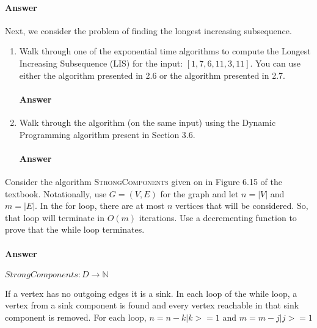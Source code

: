 \documentclass{article}
\begin{document}
\paragraph{Answer}
\todo{}

\collab{\todo{}}

Next, we consider the problem of finding the longest increasing subsequence.

\begin{enumerate}
    \item
        Walk through one of the exponential time algorithms to compute the
        Longest Increasing Subsequence (LIS) for the input: $\left[ 1, 7, 6, 11,
        3, 11 \right]$.  You can use either the algorithm presented in 2.6 or
        the algorithm presented in 2.7.

        \paragraph{Answer} \todo{}

    \item
        Walk through the algorithm (on the same input) using the Dynamic Programming algorithm
        present in Section 3.6.

        \paragraph{Answer} \todo{}

\end{enumerate}

\collab{\todo{}}

Consider the algorithm \textsc{StrongComponents} given on in Figure 6.15 of the
textbook. Notationally, use $G=(V,E)$ for the graph and let $n=|V|$ and $m=|E|$.
In the for loop, there are at most $n$ vertices that will be
considered. So, that loop will terminate in $O(m)$ iterations.
Use a decrementing function to prove that the while loop terminates.

\paragraph{Answer}

$StrongComponents: D \rightarrow \mathbb{N}$

If a vertex has no outgoing edges it is a sink. In each loop of the while loop,
a vertex from a sink component is found and every vertex reachable in that sink
component is removed. For each loop, $n = n - k | k >= 1$ and $m= m -j | j >= 1$
\end{document}
